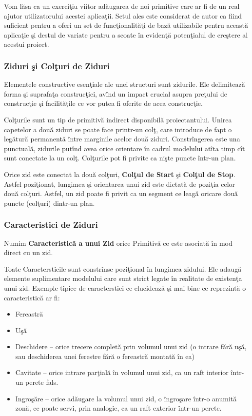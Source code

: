 Vom lăsa ca un exerciţiu viitor adăugarea de noi primitive care ar fi de un 
real ajutor utilizatorului acestei aplicaţii. Setul ales este considerat de 
autor ca fiind suficient pentru a oferi un set de funcţionalităţi de bază 
utilizabile pentru această aplicaţie şi destul de variate pentru a scoate în 
evidenţă potenţialul de creştere al acestui proiect.

\subsubsection{Ziduri şi Colţuri de Ziduri}

Elementele constructive esenţiale ale unei structuri sunt zidurile. Ele 
delimitează forma şi suprafaţa construcţiei, avînd un impact crucial asupra 
preţului de construcţie şi facilităţile ce vor putea fi oferite de acea 
construcţie.

Colţurile sunt un tip de primitivă indirect disponibilă proiectantului. Unirea 
capetelor a două ziduri se poate face printr-un colţ, care introduce de fapt o 
legătură permanentă între marginile acelor două ziduri. Constrîngerea este una 
punctuală, zidurile putînd avea orice orientare în cadrul modelului atîta timp 
cît sunt conectate la un colţ. Colţurile pot fi privite ca nişte puncte într-un 
plan.

Orice zid este conectat la două colţuri, \textbf{Colţul de Start} şi 
\textbf{Colţul de Stop}. Astfel poziţionat, lungimea şi orientarea unui zid 
este dictată de poziţia celor două colţuri. Astfel, un zid poate fi privit ca 
un segment ce leagă oricare două puncte (colţuri) dintr-un plan.

\subsubsection{Caracteristici de Ziduri}

\begin{definition}
\label{define:feature}
Numim \textbf{Caracteristică a unui Zid} orice Primitivă ce este asociată în 
mod direct cu un zid.
\end{definition}

Toate Caractersticile sunt constrînse poziţional în lungimea zidului. Ele 
adaugă elemente suplimentare modelului care sunt strict legate în realitate de 
existenţa unui zid. Exemple tipice de caracterstici ce elucidează şi mai bine 
ce reprezintă o caracteristică ar fi:

\begin{itemize}
  \item Fereastră
  \item Uşă
  \item Deschidere -- orice trecere completă prin volumul unui zid (o intrare 
  fără uşă, sau deschiderea unei ferestre fără o fereastră montată în ea)
  \item Cavitate -- orice intrare parţială în volumul unui zid, ca un raft 
  interior într-un perete fals.
  \item Ingroşăre -- orice adăugare la volumul unui zid, o îngroşare într-o 
  anumită zonă, ce poate servi, prin analogie, ca un raft exterior într-un 
  perete.
\end{itemize}
  
